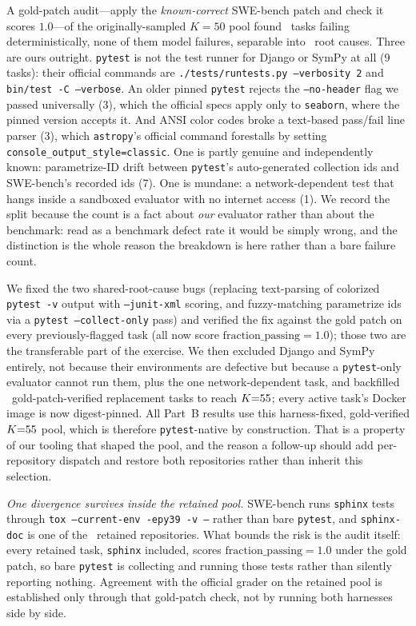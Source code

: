 A gold-patch audit---apply the \emph{known-correct} SWE-bench patch and check it scores $1.0$---of the originally-sampled $K{=}50$ pool found \statPBAuditFailN\ tasks failing deterministically, none of them model failures, separable into \statPBAuditRootCauses\ root causes. Three are ours outright. \texttt{pytest} is not the test runner for Django or SymPy at all (9 tasks): their official commands are \texttt{./tests/runtests.py --verbosity 2} and \texttt{bin/test -C --verbose}. An older pinned \texttt{pytest} rejects the \texttt{--no-header} flag we passed universally (3), which the official specs apply only to \texttt{seaborn}, where the pinned version accepts it. And ANSI color codes broke a text-based pass/fail line parser (3), which \texttt{astropy}'s official command forestalls by setting \texttt{console\_output\_style=classic}. One is partly genuine and independently known: parametrize-ID drift between \texttt{pytest}'s auto-generated collection ids and SWE-bench's recorded ids (7). One is mundane: a network-dependent test that hangs inside a sandboxed evaluator with no internet access (1). We record the split because the count is a fact about \emph{our} evaluator rather than about the benchmark: read as a benchmark defect rate it would be simply wrong, and the distinction is the whole reason the breakdown is here rather than a bare failure count.

We fixed the two shared-root-cause bugs (replacing text-parsing of colorized \texttt{pytest -v} output with \texttt{--junit-xml} scoring, and fuzzy-matching parametrize ids via a \texttt{pytest --collect-only} pass) and verified the fix against the gold patch on every previously-flagged task (all now score $\mathrm{fraction\_passing}{=}1.0$); those two are the transferable part of the exercise. We then excluded Django and SymPy entirely, not because their environments are defective but because a \texttt{pytest}-only evaluator cannot run them, plus the one network-dependent task, and backfilled \statPBTaskPoolBackfilled\ gold-patch-verified replacement tasks to reach $K{=}55$; every active task's Docker image is now digest-pinned. All Part~B results use this harness-fixed, gold-verified $K{=}55$ pool, which is therefore \texttt{pytest}-native by construction. That is a property of our tooling that shaped the pool, and the reason a follow-up should add per-repository dispatch and restore both repositories rather than inherit this selection.

\emph{One divergence survives inside the retained pool.} SWE-bench runs \texttt{sphinx} tests through \texttt{tox --current-env -epy39 -v --} rather than bare \texttt{pytest}, and \texttt{sphinx-doc} is one of the \statPBTaskPoolRepos\ retained repositories. What bounds the risk is the audit itself: every retained task, \texttt{sphinx} included, scores $\mathrm{fraction\_passing}{=}1.0$ under the gold patch, so bare \texttt{pytest} is collecting and running those tests rather than silently reporting nothing. Agreement with the official grader on the retained pool is established only through that gold-patch check, not by running both harnesses side by side.

